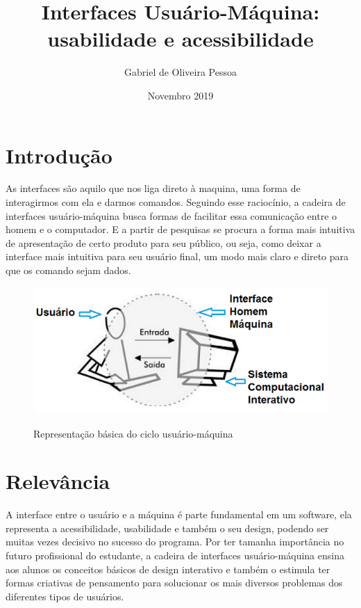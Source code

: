\documentclass[10pt]{article}
\title{Interfaces Usuário-Máquina: usabilidade e acessibilidade}
\author{Gabriel de Oliveira Pessoa}
\date{Novembro 2019}
\begin{document}
\maketitle

\section{Introdução}
As interfaces são aquilo que nos liga direto à maquina, uma forma de interagirmos com ela e darmos comandos. Seguindo esse raciocínio, a cadeira de interfaces usuário-máquina busca formas de facilitar essa comunicação entre o homem e o computador. E a partir de pesquisas se procura a forma mais intuitiva de apresentação de certo produto para seu público, ou seja, como deixar a interface mais intuitiva para seu usuário final, um modo mais claro e direto para que os comando sejam dados.

\begin{figure}[h!]
\centering
\includegraphics[scale=0.5]{UI.png}
\caption{Representação básica do ciclo usuário-máquina}\cite{hitec}
\label{fig:universe}
\end{figure}

\section{Relevância}
A interface entre o usuário e a máquina é parte fundamental em um software, ela representa a acessibilidade, usabilidade e também o seu design, podendo ser muitas vezes decisivo no sucesso do programa. Por ter tamanha importância no futuro profissional do estudante, a cadeira de interfaces usuário-máquina ensina aos alunos os conceitos básicos de design interativo e também o estimula ter formas criativas de pensamento para solucionar os mais diversos problemas dos diferentes tipos de usuários.  \cite{repositorioufsc} \cite{olharcientifico}
\end{document}
